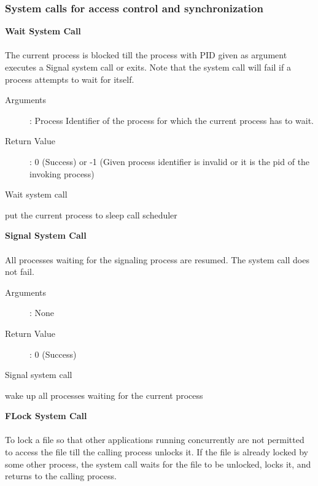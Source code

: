 \documentclass[10pt]{article}
\begin{document}
\subsubsection{System calls for access control and synchronization}
\textbf{Wait System Call}
\\ \\
The current process is blocked till the process with PID given as argument executes a Signal system call or exits. Note that the system call will fail if a process attempts to wait for itself.  
\begin{description}
\item[Arguments]: Process Identifier of the process for which the current process has to wait.
\item[Return Value]: 0 (Success) or -1 (Given process identifier is invalid or it is the pid of the invoking process)
\end{description} 
\begin{algorithm}
\caption{Wait system call}
\begin{algorithmic}
\ENDIF
\STATE put the current process to sleep
\STATE call scheduler
\end{algorithmic}
\end{algorithm}
\textbf{Signal System Call}
\\ \\
All processes waiting for the signaling process are resumed. The system call does not fail.
\begin{description}
\item[Arguments]: None
\item[Return Value]: 0 (Success) 
\end{description}
\begin{algorithm}
\caption{Signal system call}
\begin{algorithmic}
\STATE wake up all processes waiting for the current process
\RETURN
\end{algorithmic}
\end{algorithm}
\vspace{8mm}
\textbf{FLock System Call}
\\ \\
To lock a file so that other applications running concurrently are not permitted to access the file till the calling process unlocks it. If the file is already locked by some other process, the system call waits for the file to be unlocked, locks it, and returns to the calling process.   
\end{document}
